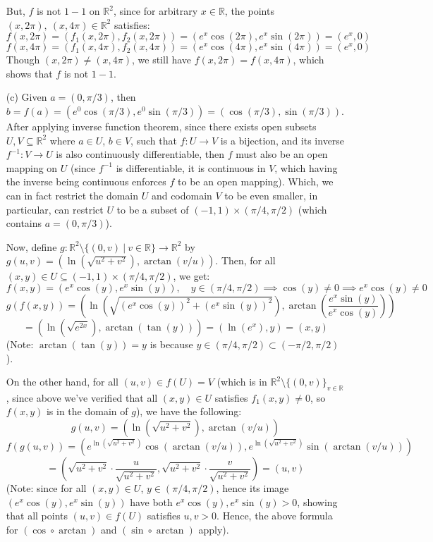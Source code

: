 \documentclass{article}
\begin{document}
\begin{itemize}
    But, $f$ is not $1-1$ on $\mathbb{R}^2$, since for arbitrary $x\in \mathbb{R}$, the points $(x,2\pi),\ (x,4\pi)\in\mathbb{R}^2$ satisfies:
    $$f(x,2\pi) = (f_1(x,2\pi),f_2(x,2\pi))=(e^x\cos(2\pi),e^x\sin(2\pi)) = (e^x,0)$$
    $$f(x,4\pi) = (f_1(x,4\pi),f_2(x,4\pi))=(e^x\cos(4\pi),e^x\sin(4\pi)) = (e^x,0)$$
    Though $(x,2\pi)\neq (x,4\pi)$, we still have $f(x,2\pi)=f(x,4\pi)$, which shows that $f$ is not $1-1$.

    \hfil

    \item[(c)] Given $a=(0,\pi/3)$, then $b=f(a)=(e^0\cos(\pi/3),e^0\sin(\pi/3)) = (\cos(\pi/3),\sin(\pi/3))$. After applying inverse function theorem, since there exists open subsets $U,V\subseteq \mathbb{R}^2$ where $a\in U$, $b\in V$,
    such that $f:U\rightarrow V$ is a bijection, and its inverse $f^{-1}:V\rightarrow U$ is also continuously differentiable, then $f$ must also be an open mapping on $U$ (since $f^{-1}$ is differentiable, it is continuous in $V$, which having the inverse being continuous enforces $f$ to be an open mapping).
    Which, we can in fact restrict the domain $U$ and codomain $V$ to be even smaller, in particular, can restrict $U$ to be a subset of $(-1,1)\times (\pi/4,\pi/2)$ (which contains $a=(0,\pi/3)$).

    Now, define $g:\mathbb{R}^2\setminus\{(0,v)\ |\ v\in\mathbb{R}\}\rightarrow \mathbb{R}^2$ by $g(u,v)=(\ln(\sqrt{u^2+v^2}),\arctan(v/u))$. Then, for all $(x,y)\in U\subseteq (-1,1)\times (\pi/4,\pi/2)$, we get:
    $$f(x,y) = (e^x\cos(y),e^x\sin(y)),\quad y\in (\pi/4,\pi/2)\implies \cos(y)\neq 0\implies e^x\cos(y)\neq 0$$
    $$g(f(x,y)) = \left(\ln\left(\sqrt{(e^x\cos(y))^2+(e^x\sin(y))^2}\right), \arctan\left(\frac{e^x\sin(y)}{e^x\cos(y)}\right)\right)$$
    $$ = (\ln(\sqrt{e^{2x}}), \arctan(\tan(y))) = (\ln(e^x), y) = (x,y)$$
    (Note: $\arctan(\tan(y))=y$ is because $y\in (\pi/4,\pi/2)\subset (-\pi/2,\pi/2)$).

    On the other hand, for all $(u,v)\in f(U) = V$ (which is in $\mathbb{R}^2\setminus\{(0,v)\}_{v\in\mathbb{R}}$, since above we've verified that all $(x,y)\in U$ satisfies $f_1(x,y)\neq 0$, so $f(x,y)$ is in the domain of $g$), we have the following:
    $$g(u,v)=(\ln(\sqrt{u^2+v^2}),\arctan(v/u))$$
    $$f(g(u,v)) = \left(e^{\ln(\sqrt{u^2+v^2})}\cos(\arctan(v/u)),e^{\ln(\sqrt{u^2+v^2})}\sin(\arctan(v/u))\right)$$
    $$ = \left(\sqrt{u^2+v^2}\cdot\frac{u}{\sqrt{u^2+v^2}},\sqrt{u^2+v^2}\cdot \frac{v}{\sqrt{u^2+v^2}}\right) = (u,v)$$
    (Note: since for all $(x,y)\in U$, $y\in (\pi/4,\pi/2)$, hence its image $(e^x\cos(y),e^x\sin(y))$ have both $e^x\cos(y),e^x\sin(y)>0$, showing that all points $(u,v)\in f(U)$ satisfies $u,v>0$. Hence, the above formula for $(\cos\circ \arctan)$ and $(\sin\circ \arctan)$ apply).


\end{itemize}
\end{document}
